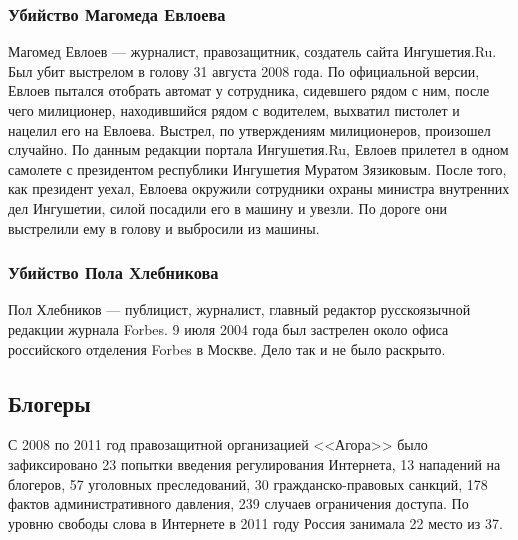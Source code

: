 \subsubsection{Убийство Магомеда Евлоева}
Магомед Евлоев --- журналист, правозащитник, создатель сайта Ингушетия.Ru. Был убит выстрелом в голову 31 августа 2008 года. По официальной версии, Евлоев пытался отобрать автомат у сотрудника, сидевшего рядом с ним, после чего милиционер, находившийся рядом с водителем, выхватил пистолет и нацелил его на Евлоева. Выстрел, по утверждениям милиционеров, произошел случайно\cite{evloev_mvd}. По данным редакции портала Ингушетия.Ru, Евлоев прилетел в одном самолете с президентом республики Ингушетия Муратом Зязиковым. После того, как президент уехал, Евлоева окружили сотрудники охраны министра внутренних дел Ингушетии, силой посадили его в машину и увезли. По дороге они выстрелили ему в голову и выбросили из машины\cite{evloev_death}.
\subsubsection{Убийство Пола Хлебникова}
Пол Хлебников --- публицист, журналист, главный редактор русскоязычной редакции журнала Forbes. 9 июля 2004 года был застрелен около офиса российского отделения Forbes в Москве\cite{hlebnikov_death}. Дело так и не было раскрыто.
\subsection{Блогеры}
С 2008 по 2011 год правозащитной организацией <<Агора>> было зафиксировано 23 попытки введения регулирования Интернета, 13 нападений на блогеров, 57 уголовных преследований, 30 гражданско-правовых санкций, 178 фактов административного давления, 239 случаев ограничения доступа\cite{agoranet,agoranet2011}. По уровню свободы слова в Интернете в 2011 году Россия занимала 22 место из 37\cite{netfreedom}.
